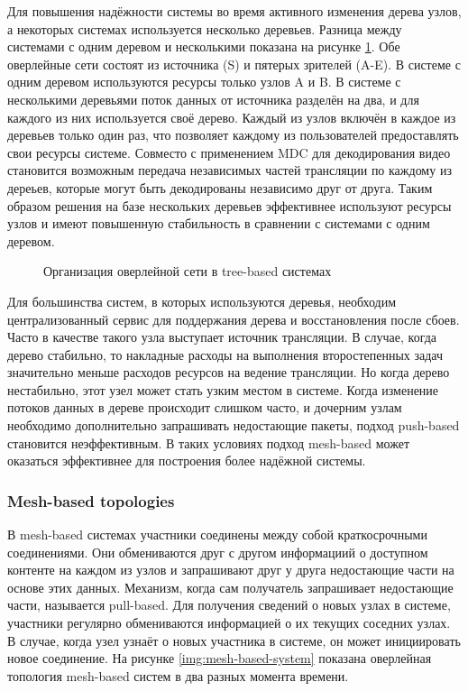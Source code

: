 		Для повышения надёжности системы во время активного изменения дерева узлов, а некоторых системах используется
		несколько деревьев. Разница между системами с одним деревом и несколькими показана на рисунке
		\ref{img:tree-based-system}. Обе оверлейные сети состоят из источника (S) и пятерых зрителей (A-E). В системе с
		одним деревом используются ресурсы только узлов A и B. В системе с несколькими деревьями поток данных от
		источника разделён на два, и для каждого из них используется своё дерево. Каждый из узлов включён в каждое из
		деревьев только один раз, что позволяет каждому из пользователей предоставлять свои ресурсы системе. Совместо с
		применением MDC для декодирования видео становится возможным передача независимых частей трансляции по каждому
		из дереьев, которые могут быть декодированы независимо друг от друга. Таким образом решения на базе нескольких
		деревьев эффективнее используют ресурсы узлов и имеют повышенную стабильность в сравнении с системами с одним
		деревом.

		\begin{figure}[h]
			\caption{Организация оверлейной сети в tree-based системах}
			\label{img:tree-based-system}
		\end{figure}

		Для большинства систем, в которых используются деревья, необходим централизованный сервис для поддержания дерева
		и восстановления после сбоев. Часто в качестве такого узла выступает источник трансляции. В случае, когда дерево
		стабильно, то накладные расходы на выполнения второстепенных задач значительно меньше расходов ресурсов на
		ведение трансляции. Но когда дерево нестабильно, этот узел может стать узким местом в системе. Когда изменение
		потоков данных в дереве происходит слишком часто, и дочерним узлам необходимо дополнительно запрашивать
		недостающие пакеты, подход push-based становится неэффективным. В таких условиях подход mesh-based
		может оказаться эффективнее для построения более надёжной системы.

		\subsubsection{Mesh-based topologies}
		В mesh-based системах участники соединены между собой краткосрочными соединениями. Они обмениваются друг с
		другом информациий о доступном контенте на каждом из узлов и запрашивают друг у друга недостающие части на
		основе этих данных. Механизм, когда сам получатель запрашивает недостающие части, называется pull-based.
		Для получения сведений о новых узлах в системе, участники регулярно обмениваются информацией о их текущих
		соседних узлах. В случае, когда узел узнаёт о новых участника в системе, он может инициировать новое соединение.
		На рисунке \ref{img:mesh-based-system} показана оверлейная топология mesh-based систем в два разных момента
		времени.

